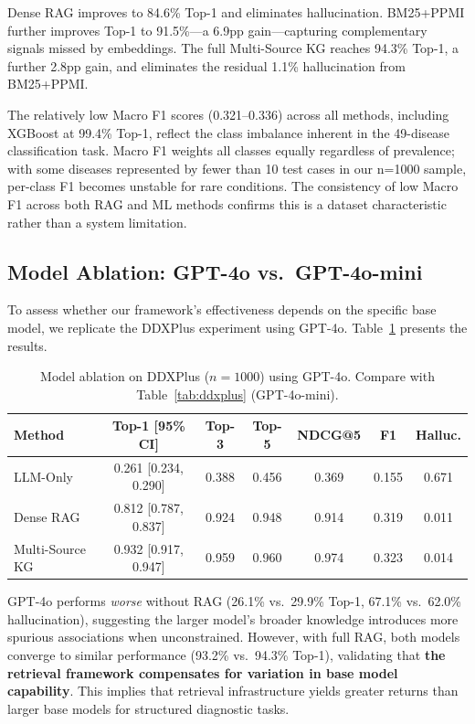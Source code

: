 \documentclass[preprint,12pt]{elsarticle}
\begin{document}
Dense RAG improves to 84.6\% Top-1 and eliminates hallucination. BM25+PPMI further improves Top-1 to 91.5\%---a 6.9pp gain---capturing complementary signals missed by embeddings. The full Multi-Source KG reaches 94.3\% Top-1, a further 2.8pp gain, and eliminates the residual 1.1\% hallucination from BM25+PPMI.

The relatively low Macro F1 scores (0.321–0.336) across all methods, including XGBoost at 99.4\% Top-1, reflect the class imbalance inherent in the 49-disease classification task. Macro F1 weights all classes equally regardless of prevalence; with some diseases represented by fewer than 10 test cases in our n=1000 sample, per-class F1 becomes unstable for rare conditions. The consistency of low Macro F1 across both RAG and ML methods confirms this is a dataset characteristic rather than a system limitation.

\subsection{Model Ablation: GPT-4o vs.\ GPT-4o-mini}
\label{sec:model_ablation}

To assess whether our framework's effectiveness depends on the specific base model, we replicate the DDXPlus experiment using GPT-4o. Table~\ref{tab:gpt4o} presents the results.

\begin{table}[t]
\centering
\caption{Model ablation on DDXPlus ($n{=}1000$) using GPT-4o. Compare with Table~\ref{tab:ddxplus} (GPT-4o-mini).}
\label{tab:gpt4o}
\begin{tabular}{lcccccc}
\toprule
\textbf{Method} & \textbf{Top-1 [95\% CI]} & \textbf{Top-3} & \textbf{Top-5} & \textbf{NDCG@5} & \textbf{F1} & \textbf{Halluc.} \\
\midrule
LLM-Only       & 0.261 {[}0.234, 0.290{]} & 0.388 & 0.456 & 0.369 & 0.155 & 0.671 \\
Dense RAG       & 0.812 {[}0.787, 0.837{]} & 0.924 & 0.948 & 0.914 & 0.319 & 0.011 \\
Multi-Source KG & 0.932 {[}0.917, 0.947{]} & 0.959 & 0.960 & 0.974 & 0.323 & 0.014 \\
\bottomrule
\end{tabular}
\end{table}

GPT-4o performs \emph{worse} without RAG (26.1\% vs.\ 29.9\% Top-1, 67.1\% vs.\ 62.0\% hallucination), suggesting the larger model's broader knowledge introduces more spurious associations when unconstrained. However, with full RAG, both models converge to similar performance (93.2\% vs.\ 94.3\% Top-1), validating that \textbf{the retrieval framework compensates for variation in base model capability}. This implies that retrieval infrastructure yields greater returns than larger base models for structured diagnostic tasks.
\end{document}
